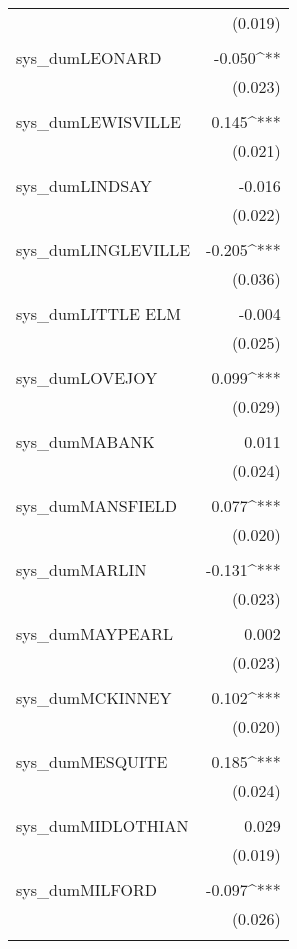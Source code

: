 \begin{table}[!htbp]
\begin{tabular}{@{\extracolsep{5pt}}lD{.}{.}{-3} }
  & (0.019) \\ 
  & \\ 
 sys\_dumLEONARD & -0.050^{**} \\ 
  & (0.023) \\ 
  & \\ 
 sys\_dumLEWISVILLE & 0.145^{***} \\ 
  & (0.021) \\ 
  & \\ 
 sys\_dumLINDSAY & -0.016 \\ 
  & (0.022) \\ 
  & \\ 
 sys\_dumLINGLEVILLE & -0.205^{***} \\ 
  & (0.036) \\ 
  & \\ 
 sys\_dumLITTLE ELM & -0.004 \\ 
  & (0.025) \\ 
  & \\ 
 sys\_dumLOVEJOY & 0.099^{***} \\ 
  & (0.029) \\ 
  & \\ 
 sys\_dumMABANK & 0.011 \\ 
  & (0.024) \\ 
  & \\ 
 sys\_dumMANSFIELD & 0.077^{***} \\ 
  & (0.020) \\ 
  & \\ 
 sys\_dumMARLIN & -0.131^{***} \\ 
  & (0.023) \\ 
  & \\ 
 sys\_dumMAYPEARL & 0.002 \\ 
  & (0.023) \\ 
  & \\ 
 sys\_dumMCKINNEY & 0.102^{***} \\ 
  & (0.020) \\ 
  & \\ 
 sys\_dumMESQUITE & 0.185^{***} \\ 
  & (0.024) \\ 
  & \\ 
 sys\_dumMIDLOTHIAN & 0.029 \\ 
  & (0.019) \\ 
  & \\ 
 sys\_dumMILFORD & -0.097^{***} \\ 
  & (0.026) \\ 
  & \\ 

\end{tabular}
\end{table}
